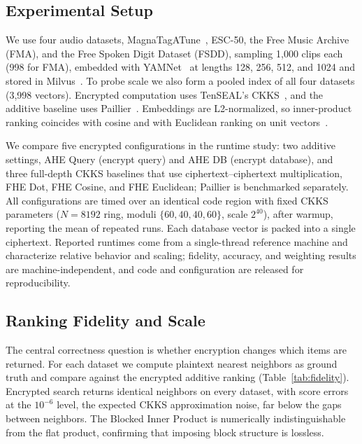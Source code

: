 \documentclass[sigconf,nonacm]{acmart}
\begin{document}
\subsection{Experimental Setup}
\label{sec:setup}
We use four audio datasets, MagnaTagATune~\cite{law2009magnatagatune}, ESC-50, the Free Music Archive (FMA), and the Free Spoken Digit Dataset (FSDD), sampling 1{,}000 clips each (998 for FMA), embedded with YAMNet~\cite{plakal2020yamnet} at lengths 128, 256, 512, and 1024 and stored in Milvus~\cite{milvus2021}. To probe scale we also form a pooled index of all four datasets (3{,}998 vectors). Encrypted computation uses TenSEAL's CKKS~\cite{benaissa2021tenseal,cheon2017homomorphic}, and the additive baseline uses Paillier~\cite{paillier1999}. Embeddings are L2-normalized, so inner-product ranking coincides with cosine and with Euclidean ranking on unit vectors~\cite{johnson2017faiss}.

We compare five encrypted configurations in the runtime study: two additive settings, AHE Query (encrypt query) and AHE DB (encrypt database), and three full-depth CKKS baselines that use ciphertext--ciphertext multiplication, FHE Dot, FHE Cosine, and FHE Euclidean; Paillier is benchmarked separately. All configurations are timed over an identical code region with fixed CKKS parameters ($N{=}8192$ ring, moduli $\{60,40,40,60\}$, scale $2^{40}$), after warmup, reporting the mean of repeated runs. Each database vector is packed into a single ciphertext. Reported runtimes come from a single-thread reference machine and characterize relative behavior and scaling; fidelity, accuracy, and weighting results are machine-independent, and code and configuration are released for reproducibility.

\subsection{Ranking Fidelity and Scale}
\label{sec:fidelity}
The central correctness question is whether encryption changes which items are returned. For each dataset we compute plaintext nearest neighbors as ground truth and compare against the encrypted additive ranking (Table~\ref{tab:fidelity}). Encrypted search returns identical neighbors on every dataset, with score errors at the $10^{-6}$ level, the expected CKKS approximation noise, far below the gaps between neighbors. The Blocked Inner Product is numerically indistinguishable from the flat product, confirming that imposing block structure is lossless.
\end{document}
